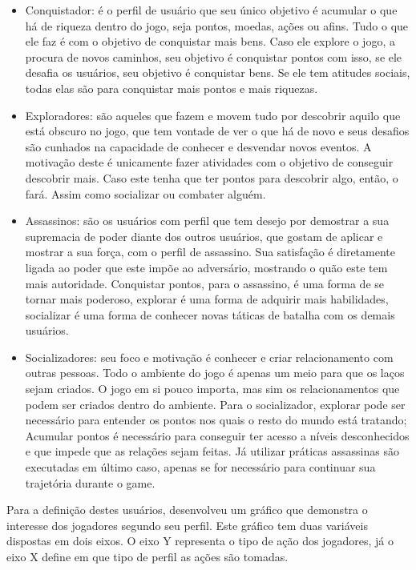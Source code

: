 \begin{itemize}
    \item Conquistador: é o perfil de usuário que seu único objetivo é acumular o
        que há de riqueza dentro do jogo, seja pontos, moedas, ações ou afins.
        Tudo o que ele faz é com o objetivo de conquistar mais bens. Caso ele explore
        o jogo, a procura de novos caminhos, seu objetivo é conquistar pontos com
        isso, se ele desafia os usuários, seu objetivo é conquistar bens. Se ele
        tem atitudes sociais, todas elas são para conquistar mais pontos e mais riquezas.
    \item Exploradores: são aqueles que fazem e movem tudo por descobrir aquilo
        que está obscuro no jogo, que tem vontade de ver o que há de novo e seus desafios
        são cunhados na capacidade de conhecer e desvendar novos eventos. A motivação
        deste é unicamente fazer atividades com o objetivo de conseguir descobrir mais.
        Caso este tenha que ter pontos para descobrir algo, então, o fará. Assim
        como socializar ou combater alguém.
    \item Assassinos: são os usuários com perfil que tem desejo por demostrar a sua
        supremacia de poder diante dos outros usuários, que gostam de aplicar
        e mostrar a sua força, com o perfil de assassino. Sua satisfação
        é diretamente ligada ao poder que este impõe ao adversário, mostrando
        o quão este tem mais autoridade. Conquistar pontos, para o assassino, é uma forma
        de se tornar mais poderoso, explorar é uma forma de adquirir mais habilidades,
        socializar é uma forma de conhecer novas táticas de batalha com os demais
        usuários.
    \item Socializadores: seu foco e motivação é conhecer e criar relacionamento
        com outras pessoas. Todo o ambiente do jogo é apenas um meio para que
        os laços sejam criados. O jogo em si pouco importa, mas sim os relacionamentos
        que podem ser criados dentro do ambiente. Para o socializador, explorar pode
        ser necessário para entender os pontos nos quais o resto do mundo está tratando;
        Acumular pontos é necessário para conseguir ter acesso a níveis desconhecidos
        e que impede que as relações sejam feitas. Já utilizar práticas assassinas são
        executadas em último caso, apenas se for necessário para continuar sua trajetória
        durante o game.
\end{itemize}

Para a definição destes usuários, \cite{bartle1996hearts} desenvolveu um gráfico que demonstra o
interesse dos jogadores segundo seu perfil. Este gráfico tem duas variáveis dispostas
em dois eixos. O eixo Y representa o tipo de ação dos jogadores, já o eixo X define
em que tipo de perfil as ações são tomadas.

